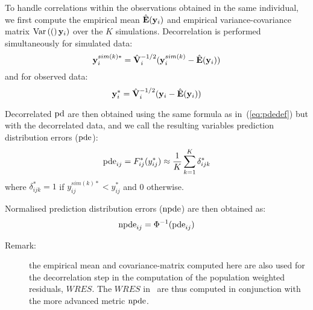 To handle correlations within the observations obtained in the same individual, we first compute the empirical mean $\hat{{\mathbf{E}}}({\mathbf{y}}_i)$ and empirical variance-covariance matrix $\mbox{Var}\left((\right){\mathbf{y}}_i)$ over the $K$ simulations. Decorrelation is performed simultaneously for simulated data:
\begin{equation}
{\mathbf{y}}_{i}^{sim(k)*}= \hat{{\mathbf{V}}}_i^{-1/2} ({\mathbf{y}}_{i}^{sim(k)}-\hat{{\mathbf{E}}}({\mathbf{y}}_i)) \label{eq:decorrsim}
\end{equation}
and for observed data:
\begin{equation}
{\mathbf{y}}_{i}^*= \hat{{\mathbf{V}}}_i^{-1/2} ({\mathbf{y}}_{i}-\hat{{\mathbf{E}}}({\mathbf{y}}_i)) \label{eq:decorrobs}
\end{equation}

Decorrelated ${\rm pd}$ are then obtained using the same formula as in~(\ref{eq:pdedef}) but with the decorrelated data, and we call the resulting variables prediction distribution errors (${\rm pde}$):
\begin{equation}
{\rm pde}_{ij} = F^*_{ij}(y^*_{ij}) \approx \frac{1}{K} \sum_{k=1}^K \delta_{ijk}^*
\end{equation}
where $\delta_{ijk}^*=1$ if $y_{ij}^{sim(k)*} < y_{ij}^*$ and 0 otherwise.

Normalised prediction distribution errors (${\rm npde}$) are then obtained as:
\begin{equation}
{\rm npde}_{ij} = \Phi^{-1} ({\rm pde}_{ij})
\end{equation}

\begin{description}
\item[Remark:] the empirical mean and covariance-matrix computed here are also used for the decorrelation step in the computation of the population weighted residuals, $WRES$. The $WRES$ in \monolix ~are thus computed in conjunction with the more advanced metric ${\rm npde}$.
\end{description}

